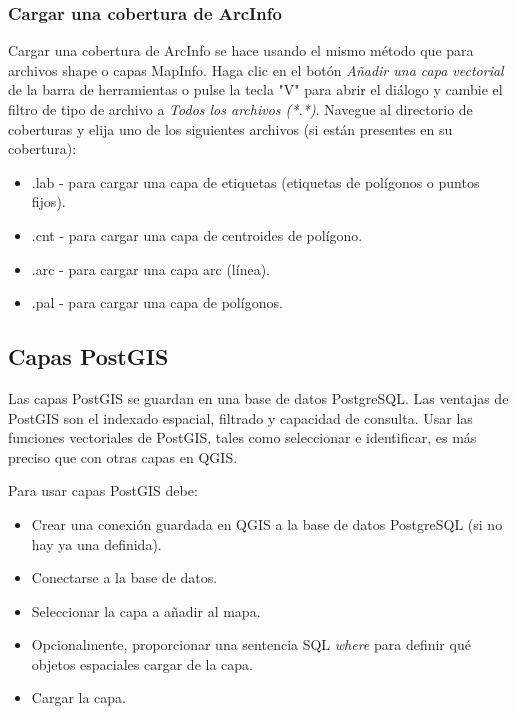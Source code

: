 \subsubsection{Cargar una cobertura de ArcInfo}

Cargar una cobertura de ArcInfo se hace usando el mismo método que para archivos shape o capas MapInfo. Haga clic en el botón \textit{Añadir una capa vectorial} de la barra de herramientas o pulse la tecla "V" para abrir el diálogo y cambie el filtro de tipo de archivo a \textit{Todos los archivos (*.*)}. Navegue al directorio de coberturas y elija uno de los siguientes archivos (si están presentes en su cobertura):

\begin{itemize}
\item .lab - para cargar una capa de etiquetas (etiquetas de polígonos o puntos fijos).
\item .cnt - para cargar una capa de centroides de polígono.
\item .arc - para cargar una capa arc (línea).
\item .pal - para cargar una capa de polígonos.
\end{itemize}

\subsection{Capas PostGIS}
\label{label_postgis} 

Las capas PostGIS se guardan en una base de datos PostgreSQL. Las ventajas de PostGIS son el indexado espacial, filtrado y capacidad de consulta. Usar las funciones vectoriales de PostGIS, tales como seleccionar e identificar, es más preciso que con otras capas en QGIS.

Para usar capas PostGIS debe:

\begin{itemize}
\item Crear una conexión guardada en QGIS a la base de datos PostgreSQL (si no hay ya una definida).
\item Conectarse a la base de datos.
\item Seleccionar la capa a añadir al mapa.
\item Opcionalmente, proporcionar una sentencia SQL \textit{where} para definir qué objetos espaciales cargar de la capa.
\item Cargar la capa.
\end{itemize}

